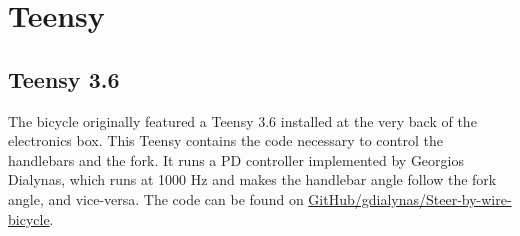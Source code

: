 \section{Teensy}

\subsection{Teensy 3.6}
The bicycle originally featured a Teensy 3.6 installed at the very back of the electronics box. This Teensy contains the code necessary to control the handlebars and the fork. It runs a PD controller implemented by Georgios Dialynas, which runs at 1000 Hz and makes the handlebar angle follow the fork angle, and vice-versa. The code can be found on \href{https://github.com/gdialynas/Steer-by-wire-bicycle}{GitHub/gdialynas/Steer-by-wire-bicycle}.

